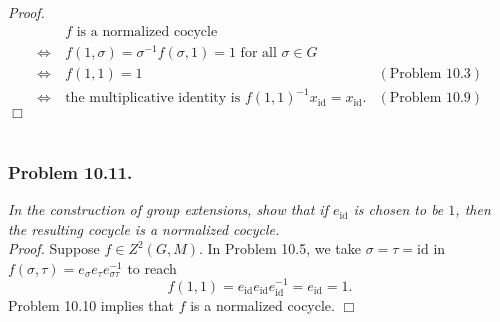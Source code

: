 \documentclass{article}
\begin{document}
\emph{Proof.}
  \begin{align*}
    & \: 
    \text{$f$ is a normalized cocycle} \\
    \Longleftrightarrow & \:
    \text{$f(1,\sigma) = \sigma^{-1}f(\sigma,1) = 1$ for all $\sigma \in G$} \\
    \Longleftrightarrow & \:
    \text{$f(1,1) = 1$}
      &(\text{Problem 10.3}) \\
    \Longleftrightarrow & \:
    \text{the multiplicative identity is $f(1,1)^{-1}x_{\mathrm{id}} = x_{\mathrm{id}}$}.
      &(\text{Problem 10.9})
  \end{align*}
$\Box$ \\\\






\subsubsection*{Problem 10.11.}
\emph{In the construction of group extensions,
show that if $e_{\mathrm{id}}$ is chosen to be $1$,
then the resulting cocycle is a normalized cocycle.} \\



\emph{Proof.}
  Suppose $f \in Z^2(G,M)$.
  In Problem 10.5,
  we take $\sigma = \tau = \mathrm{id}$ in
  $f(\sigma,\tau) = e_{\sigma}e_{\tau}e_{\sigma\tau}^{-1}$ to reach
  \[
    f(1,1)
    = e_{\mathrm{id}}e_{\mathrm{id}}e_{\mathrm{id}}^{-1}
    = e_{\mathrm{id}}
    = 1.
  \]
  Problem 10.10 implies that $f$ is a normalized cocycle.
$\Box$ \\\\



\end{document}
